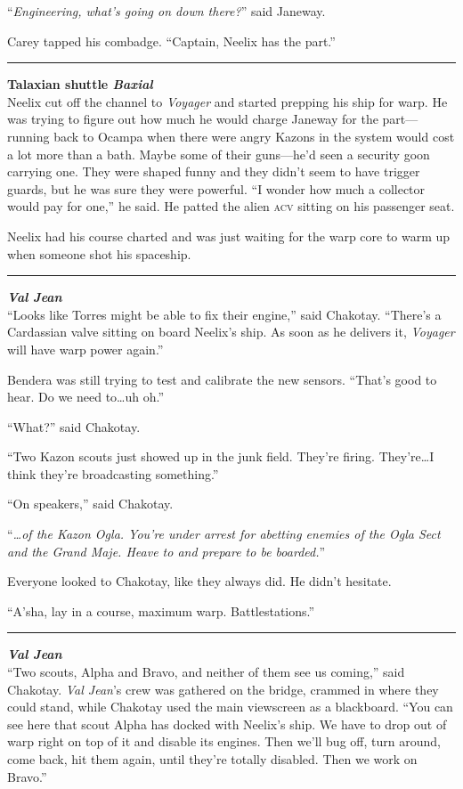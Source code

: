 \documentclass[twoside,letterpaper,12pt]{memoir}
\begin{document}
``\textit{Engineering, what's going on down there?}'' said Janeway.

Carey tapped his combadge. ``Captain, Neelix has the part.''

\fancybreak{\rule{3cm}{0.4 pt}}
\noindent\textbf{Talaxian shuttle \textit{Baxial}}\\

Neelix cut off the channel to \textit{Voyager} and started prepping his ship for warp. He was trying to figure out how much he would charge Janeway for the part---running back to Ocampa when there were angry Kazons in the system would cost a lot more than a bath. Maybe some of their guns---he'd seen a security goon carrying one. They were shaped funny and they didn't seem to have trigger guards, but he was sure they were powerful. ``I wonder how much a collector would pay for one,'' he said. He patted the alien \textsc{acv} sitting on his passenger seat.

Neelix had his course charted and was just waiting for the warp core to warm up when someone shot his spaceship.

\fancybreak{\rule{3cm}{0.4 pt}}
\noindent\textit{\textbf{Val Jean}}\\

``Looks like Torres might be able to fix their engine,'' said Chakotay. ``There’s a Cardassian valve sitting on board Neelix's ship. As soon as he delivers it, \textit{Voyager} will have warp power again.''

Bendera was still trying to test and calibrate the new sensors. ``That's good to hear. Do we need to\ldots uh oh.''

``What?'' said Chakotay.

``Two Kazon scouts just showed up in the junk field. They're firing. They're\ldots I think they're broadcasting something.''

``On speakers,'' said Chakotay.

``\textit{\ldots of the Kazon Ogla. You're under arrest for abetting enemies of the Ogla Sect and the Grand Maje. Heave to and prepare to be boarded.}''

Everyone looked to Chakotay, like they always did. He didn't hesitate.

``A'sha, lay in a course, maximum warp. Battlestations.''

\fancybreak{\rule{3cm}{0.4 pt}}
\noindent\textit{\textbf{Val Jean}}\\

``Two scouts, Alpha and Bravo, and neither of them see us coming,'' said Chakotay. \textit{Val Jean}'s crew was gathered on the bridge, crammed in where they could stand, while Chakotay used the main viewscreen as a blackboard. ``You can see here that scout Alpha has docked with Neelix's ship. We have to drop out of warp right on top of it and disable its engines. Then we'll bug off, turn around, come back, hit them again, until they’re totally disabled. Then we work on Bravo.''
\end{document}
